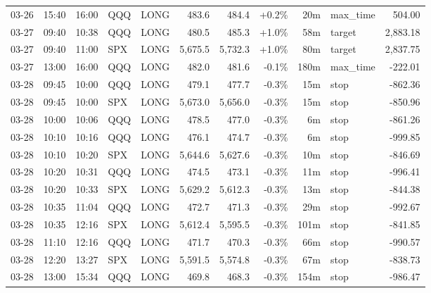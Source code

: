\documentclass[11pt,a4paper,twoside]{article}
\begin{document}
\begin{center}
\begin{longtable}{>{\color{txtmain}}l l l l l r r r r >{\color{txtmain}}l r}
03-26 & 15:40 & 16:00 & QQQ & LONG & 483.6 & 484.4 & \textcolor{wingreen}{+0.2\%} & 20m & max\_time & \textcolor{wingreen}{504.00} \\
03-27 & 09:40 & 10:38 & QQQ & LONG & 480.5 & 485.3 & \textcolor{wingreen}{+1.0\%} & 58m & target & \textcolor{wingreen}{2,883.18} \\
03-27 & 09:40 & 11:00 & SPX & LONG & 5,675.5 & 5,732.3 & \textcolor{wingreen}{+1.0\%} & 80m & target & \textcolor{wingreen}{2,837.75} \\
03-27 & 13:00 & 16:00 & QQQ & LONG & 482.0 & 481.6 & \textcolor{lossred}{-0.1\%} & 180m & max\_time & \textcolor{lossred}{-222.01} \\
03-28 & 09:45 & 10:00 & QQQ & LONG & 479.1 & 477.7 & \textcolor{lossred}{-0.3\%} & 15m & stop & \textcolor{lossred}{-862.36} \\
03-28 & 09:45 & 10:00 & SPX & LONG & 5,673.0 & 5,656.0 & \textcolor{lossred}{-0.3\%} & 15m & stop & \textcolor{lossred}{-850.96} \\
03-28 & 10:00 & 10:06 & QQQ & LONG & 478.5 & 477.0 & \textcolor{lossred}{-0.3\%} & 6m & stop & \textcolor{lossred}{-861.26} \\
03-28 & 10:10 & 10:16 & QQQ & LONG & 476.1 & 474.7 & \textcolor{lossred}{-0.3\%} & 6m & stop & \textcolor{lossred}{-999.85} \\
03-28 & 10:10 & 10:20 & SPX & LONG & 5,644.6 & 5,627.6 & \textcolor{lossred}{-0.3\%} & 10m & stop & \textcolor{lossred}{-846.69} \\
03-28 & 10:20 & 10:31 & QQQ & LONG & 474.5 & 473.1 & \textcolor{lossred}{-0.3\%} & 11m & stop & \textcolor{lossred}{-996.41} \\
03-28 & 10:20 & 10:33 & SPX & LONG & 5,629.2 & 5,612.3 & \textcolor{lossred}{-0.3\%} & 13m & stop & \textcolor{lossred}{-844.38} \\
03-28 & 10:35 & 11:04 & QQQ & LONG & 472.7 & 471.3 & \textcolor{lossred}{-0.3\%} & 29m & stop & \textcolor{lossred}{-992.67} \\
03-28 & 10:35 & 12:16 & SPX & LONG & 5,612.4 & 5,595.5 & \textcolor{lossred}{-0.3\%} & 101m & stop & \textcolor{lossred}{-841.85} \\
03-28 & 11:10 & 12:16 & QQQ & LONG & 471.7 & 470.3 & \textcolor{lossred}{-0.3\%} & 66m & stop & \textcolor{lossred}{-990.57} \\
03-28 & 12:20 & 13:27 & SPX & LONG & 5,591.5 & 5,574.8 & \textcolor{lossred}{-0.3\%} & 67m & stop & \textcolor{lossred}{-838.73} \\
03-28 & 13:00 & 15:34 & QQQ & LONG & 469.8 & 468.3 & \textcolor{lossred}{-0.3\%} & 154m & stop & \textcolor{lossred}{-986.47} \\

\end{longtable}
\end{center}
\end{document}
